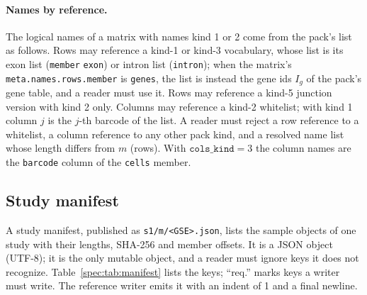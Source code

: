 \paragraph{Names by reference.}
\label{spec:names}
The logical names of a matrix with names kind 1 or 2 come from the pack's list as follows. Rows may reference a kind-1
or kind-3 vocabulary, whose list is its exon list (\texttt{member} \texttt{exon}) or intron list (\texttt{intron}); when
the matrix's \texttt{meta.names.rows.member} is \texttt{genes}, the list is instead the gene ids $I_g$ of the pack's gene
table, and a reader must use it. Rows may reference a kind-5 junction version with kind 2 only. Columns may reference a
kind-2 whitelist; with kind 1 column $j$ is the $j$-th barcode of the list. A reader must reject a row reference to a
whitelist, a column reference to any other pack kind, and a resolved name list whose length differs from $m$ (rows).
With $\texttt{cols\_kind}=3$ the column names are the \texttt{barcode} column of the \texttt{cells} member.

\subsection{Study manifest}
\label{spec:manifest}
A study manifest, published as \texttt{s1/m/<GSE>.json}, lists the sample objects of one study with their lengths,
SHA-256 and member offsets. It is a JSON object (UTF-8); it is the only mutable object, and a reader must ignore keys it
does not recognize. Table~\ref{spec:tab:manifest} lists the keys; ``req.'' marks keys a writer must write.
The reference writer emits it with an indent of 1 and a final newline.


